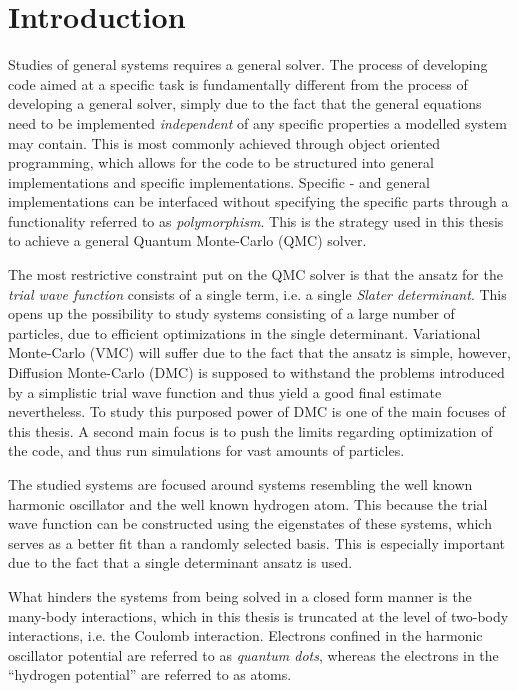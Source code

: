 \chapter{Introduction}

Studies of general systems requires a general solver. The process of developing code aimed at a specific task is fundamentally different from the process of developing a general solver, simply due to the fact that the general equations need to be implemented \textit{independent} of any specific properties a modelled system may contain. This is most commonly achieved through object oriented programming, which allows for the code to be structured into general implementations and specific implementations. Specific - and general implementations can be interfaced without specifying the specific parts through a functionality referred to as \textit{polymorphism}. This is the strategy used in this thesis to achieve a general Quantum Monte-Carlo (QMC) solver.  

The most restrictive constraint put on the QMC solver is that the ansatz for the \textit{trial wave function} consists of a single term, i.e. a single \textit{Slater determinant}. This opens up the possibility to study systems consisting of a large number of particles, due to efficient optimizations in the single determinant. Variational Monte-Carlo (VMC) will suffer due to the fact that the ansatz is simple, however,  Diffusion Monte-Carlo (DMC) is supposed to withstand the problems introduced by a simplistic trial wave function and thus yield a good final estimate nevertheless. To study this purposed power of DMC is one of the main focuses of this thesis. A second main focus is to push the limits regarding optimization of the code, and thus run simulations for vast amounts of particles.

The studied systems are focused around systems resembling the well known harmonic oscillator and the well known hydrogen atom. This because the trial wave function can be constructed using the eigenstates of these systems, which serves as a better fit than a randomly selected basis. This is especially important due to the fact that a single determinant ansatz is used. 

What hinders the systems from being solved in a closed form manner is the many-body interactions, which in this thesis is truncated at the level of two-body interactions, i.e. the Coulomb interaction. Electrons confined in the harmonic oscillator potential are referred to as \textit{quantum dots}, whereas the electrons in the ``hydrogen potential'' are referred to as atoms. 

